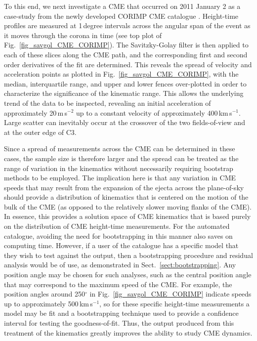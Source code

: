 \documentclass[structabstract]{aa}
\begin{document}
To this end, we next investigate a CME that occurred on 2011 January 2 as a case-study from the newly developed CORIMP CME catalogue \citep{2012ApJ...752..144M, 2012ApJ...752..145B}. Height-time profiles are measured at 1\,degree intervals across the angular span of the event as it moves through the corona in time (see top plot of Fig.~\ref{fig_savgol_CME_CORIMP}). The Savitzky-Golay filter is then applied to each of these slices along the CME path, and the corresponding first and second order derivatives of the fit are determined. This reveals the spread of velocity and acceleration points as plotted in Fig.~\ref{fig_savgol_CME_CORIMP}, with the median, interquartile range, and upper and lower fences over-plotted in order to characterize the significance of the kinematic range. This allows the underlying trend of the data to be inspected, revealing an initial acceleration of approximately 20\,m\,s$^{-2}$ up to a constant velocity of approximately 400\,km\,s$^{-1}$. Large scatter can inevitably occur at the crossover of the two fields-of-view and at the outer edge of C3.

Since a spread of measurements across the CME can be determined in these cases, the sample size is therefore larger and the spread can be treated as the range of variation in the kinematics without necessarily requiring bootstrap methods to be employed. The implication here is that any variation in CME speeds that may result from the expansion of the ejecta across the plane-of-sky should provide a distribution of kinematics that is centered on the motion of the bulk of the CME (as opposed to the relatively slower moving flanks of the CME). In essence, this provides a solution space of CME kinematics that is based purely on the distribution of CME height-time measurements. For the automated catalogue, avoiding the need for bootstrapping in this manner also saves on computing time. However, if a user of the catalogue has a specific model that they wish to test against the output, then a bootstrapping procedure and residual analysis would be of use, as demonstrated in Sect.~\ref{sect:bootstrapping}. Any position angle may be chosen for such analyses, such as the central position angle that may correspond to the maximum speed of the CME. For example, the position angles around 250$^{\circ}$ in Fig.~\ref{fig_savgol_CME_CORIMP} indicate speeds up to approximately 500\,km\,s$^{-1}$, so for these specific height-time measurements a model may be fit and a bootstrapping technique used to provide a confidence interval for testing the goodness-of-fit. Thus, the output produced from this treatment of the kinematics greatly improves the ability to study CME dynamics.
\end{document}
